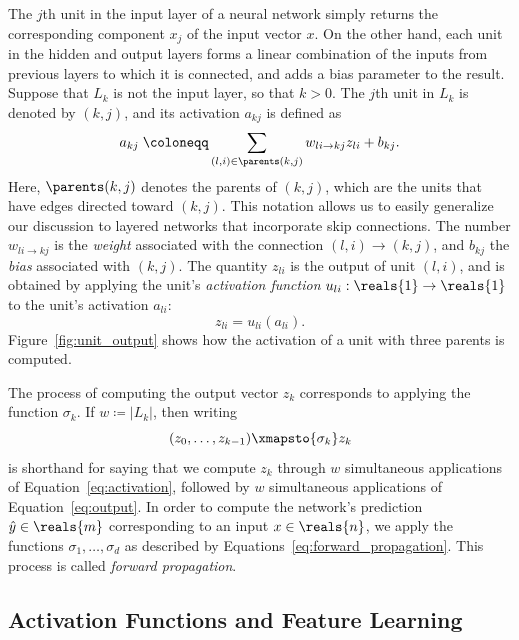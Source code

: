 \documentclass[11pt,a4paper]{article}
\numberwithin{equation}{section}
\newcommand{\weight}[2]{w_{#1 \rightarrow #2}}
\begin{document}
The $j$th unit in the input layer of a neural network simply returns the
corresponding component $x_j$ of the input vector $x$. On the other hand, each
unit in the hidden and output layers forms a linear combination of the inputs
from previous layers to which it is connected, and adds a bias parameter to the
result. Suppose that $L_k$ is not the input layer, so that $k > 0$. The $j$th
unit in $L_k$ is denoted by $(k, j)$, and its activation $a_{kj}$ is defined as
\begin{equation}
	a_{kj} \;\coloneqq \sum_{(l, i) \in \parents(k, j)} \weight{li}{kj} z_{li} + b_{kj}.
	\label{eq:activation}
\end{equation}
Here, $\parents(k, j)$ denotes the parents of $(k, j)$, which are the units that
have edges directed toward $(k, j)$. This notation allows us to easily
generalize our discussion to layered networks that incorporate skip connections.
The number $\weight{li}{kj}$ is the \emph{weight} associated with the connection
$(l, i) \rightarrow (k, j)$, and $b_{kj}$ the \emph{bias} associated with $(k,
j)$. The quantity $z_{li}$ is the output of unit $(l, i)$, and is obtained by
applying the unit's \emph{activation function} $u_{li} : \reals{1} \to
\reals{1}$ to the unit's activation $a_{li}$:
\begin{equation}
	z_{li} = u_{li}(a_{li}).
	\label{eq:output}
\end{equation}
Figure~\ref{fig:unit_output} shows how the activation of a unit with three
parents is computed.

The process of computing the output vector $z_k$ corresponds to applying the
function $\sigma_k$. If $w \coloneqq |L_k|$, then writing
\[
	(z_0, \ldots, z_{k - 1}) \xmapsto{\sigma_k} z_k
\]
is shorthand for saying that we compute $z_k$ through $w$ simultaneous
applications of Equation~\ref{eq:activation}, followed by $w$ simultaneous
applications of Equation~\ref{eq:output}. In order to compute the network's
prediction $\hat{y} \in \reals{m}$ corresponding to an input $x \in \reals{n}$,
we apply the functions $\sigma_1, \ldots, \sigma_d$ as described by
Equations~\ref{eq:forward_propagation}. This process is called \emph{forward
propagation}.

\subsection{Activation Functions and Feature Learning}
\end{document}
